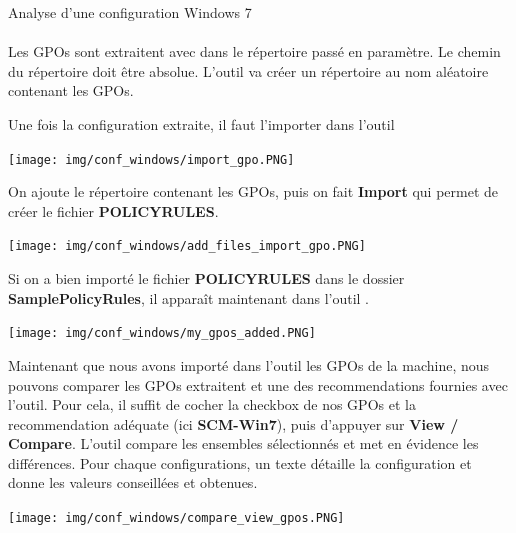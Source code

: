 \documentclass[twoside,a4paper,12pt,titlepage]{book}
\begin{document}
\begin{LongFlagConsole}{Analyse d'une configuration Windows 7}
\\\\
Les GPOs sont extraitent avec  dans le répertoire passé en paramètre. Le chemin du répertoire doit être absolue. L'outil va créer un répertoire au nom aléatoire contenant les GPOs.

Une fois la configuration extraite, il faut l'importer dans l'outil 

\begin{center}
	\texttt{[image: img/conf\_windows/import\_gpo.PNG]}
	\label{fig:import_gpo}
\end{center}

On ajoute le répertoire contenant les GPOs, puis on fait \textbf{Import} qui permet de créer le fichier \textbf{POLICYRULES}.
\begin{center}
	\texttt{[image: img/conf\_windows/add\_files\_import\_gpo.PNG]}
	\label{ref:add_files_import_gpo}
\end{center}

Si on a bien importé le fichier \textbf{POLICYRULES} dans le dossier \textbf{SamplePolicyRules}, il apparaît maintenant dans l'outil .
\begin{center}
	\texttt{[image: img/conf\_windows/my\_gpos\_added.PNG]}
	\label{ref:my_gpos_added}
\end{center}

Maintenant que nous avons importé dans l'outil les GPOs de la machine, nous pouvons comparer les GPOs extraitent et une des recommendations fournies avec l'outil. Pour cela, il suffit de cocher la checkbox de nos GPOs et la recommendation adéquate (ici \textbf{SCM-Win7}), puis d'appuyer sur \textbf{View / Compare}. L'outil compare les ensembles sélectionnés et met en évidence les différences. Pour chaque configurations, un texte détaille la configuration et donne les valeurs conseillées et obtenues.\\

\begin{center}
	\texttt{[image: img/conf\_windows/compare\_view\_gpos.PNG]}
	\label{ref:compare_view_gpos}
\end{center}

\end{LongFlagConsole}
\end{document}
